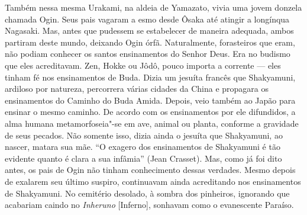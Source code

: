 Também nessa mesma Urakami, na aldeia de Yamazato, vivia uma jovem
donzela chamada Ogin. Seus pais  vagaram a esmo desde Ôsaka até atingir
a longínqua Nagasaki. Mas, antes que pudessem se estabelecer de maneira
adequada, ambos partiram deste mundo, deixando Ogin órfã. Naturalmente,
forasteiros que eram, não podiam conhecer os santos ensinamentos do
Senhor Deus. Era no budismo que eles acreditavam. Zen, Hokke ou Jôdô,
pouco importa a corrente --- eles tinham fé nos ensinamentos de Buda.
Dizia um jesuíta francês que Shakyamuni, 
ardiloso por natureza, percorrera várias cidades da China e propagara
os ensinamentos do Caminho do Buda Amida. Depois, veio também ao Japão
para ensinar o mesmo caminho. De acordo com os ensinamentos por ele
difundidos, a alma humana metamorfoseia"-se em ave, animal ou planta,
conforme a gravidade de seus pecados. Não somente isso, dizia ainda o
jesuíta que Shakyamuni, ao nascer, matara sua mãe. ``O exagero dos ensinamentos 
de Shakyamuni é tão evidente quanto é clara a sua infâmia'' (Jean Crasset). 
Mas, como já foi dito antes, os pais de Ogin não tinham conhecimento dessas
verdades. Mesmo depois de exalarem seu último suspiro, continuavam
ainda acreditando nos ensinamentos de Shakyamuni. No cemitério
desolado, à sombra dos pinheiros, ignorando que acabariam caindo no
\textit{Inheruno} [Inferno], sonhavam como o evanescente Paraíso.

